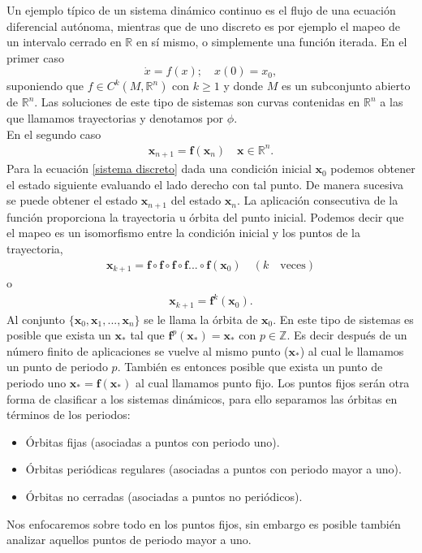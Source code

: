 Un ejemplo típico de un sistema dinámico continuo es el flujo de una ecuación diferencial autónoma, mientras que de uno discreto es por ejemplo el mapeo de un intervalo cerrado en $\mathbb{R}$ en sí mismo, o simplemente una función iterada. En el primer caso
\begin{equation}
\dot{x} =  f(x); \quad  
x(0)=x_{0} , \label{ec dif}
\end{equation}
suponiendo que $f \in C^{k}(M,\mathbb{R}^{n})$ con $k \geq 1$ y donde $M$ es un subconjunto abierto de $\mathbb{R}^{n}$. Las soluciones de este tipo de sistemas son curvas contenidas en $\mathbb{R}^{n}$ a las que llamamos trayectorias y denotamos por $\phi$.\\
En el segundo caso  
\begin{eqnarray}
\pmb x_{n+1}= \mathbf{f}(\pmb x_{n}) \quad \pmb x\in \mathbb{R}^{n}. \label{sistema discreto}
\end{eqnarray}
Para la ecuación \eqref{sistema discreto} dada una condición inicial $\pmb x_{0}$ podemos obtener el estado siguiente evaluando el lado derecho con tal punto. De manera sucesiva se puede obtener el estado $\pmb x_{n+1}$ del estado $\pmb x_{n}$. La aplicación consecutiva de la función proporciona la trayectoria u órbita del punto inicial. Podemos decir que el mapeo es un isomorfismo entre la condición inicial y los puntos de la trayectoria,
\begin{eqnarray*}
\pmb x_{k+1}=\mathbf{f}\circ\mathbf{f}\circ \mathbf{f} \circ \mathbf{f} ... \circ \mathbf{f} (\pmb x_{0})\quad (k \quad \textrm{veces})
\end{eqnarray*}
o
\begin{eqnarray*}
\pmb x_{k+1} = \mathbf{f}^{k}(\pmb x_{0}).
\end{eqnarray*}
Al conjunto $\lbrace \pmb x_{0},\pmb x_{1},...,\pmb x_{n} \rbrace$ se le llama la órbita de $\pmb x_{0}$.  En este tipo de sistemas es posible que exista un $\pmb x_{*}$ tal que $\mathbf{f}^{p}(\pmb x_{*})=\pmb x_{*}$ con $p \in \mathbb{Z}$. Es decir después de un número finito de aplicaciones se vuelve al mismo punto ($\pmb x_{*}$) al cual le llamamos un punto de periodo $p$. También es entonces posible  que exista un punto de periodo uno $\pmb x_{*}=\mathbf{f}(\pmb x_{*})$ al cual llamamos punto fijo. Los puntos fijos serán otra forma de clasificar a los sistemas dinámicos, para ello separamos las órbitas en términos de los periodos:

\begin{itemize}
\item  Órbitas fijas (asociadas a puntos con periodo uno).
\item Órbitas periódicas regulares (asociadas a puntos con periodo mayor a uno).
\item Órbitas no cerradas (asociadas a puntos no periódicos).
\end{itemize}
Nos enfocaremos sobre todo en los puntos fijos, sin embargo es posible también analizar aquellos puntos de periodo mayor a uno.
